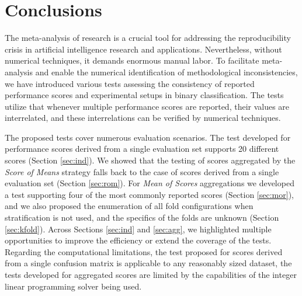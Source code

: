 \documentclass[3p, times]{elsarticle}
\begin{document}
\section{Conclusions}
\label{sec:conclusions}

The meta-analysis of research is a crucial tool for addressing the reproducibility crisis in artificial intelligence research and applications. Nevertheless, without numerical techniques, it demands enormous manual labor. To facilitate meta-analysis and enable the numerical identification of methodological inconsistencies, we have introduced various tests assessing the consistency of reported performance scores and experimental setups in binary classification. {\color{blue} The tests utilize that whenever multiple performance scores are reported, their values are interrelated, and these interrelations can be verified by numerical techniques.
}

The proposed tests cover numerous evaluation scenarios. The test developed for performance scores derived from a single evaluation set supports 20 different scores (Section \ref{sec:ind}). We showed that the testing of scores aggregated by the \emph{Score of Means} strategy falls back to the case of scores derived from a single evaluation set (Section \ref{sec:rom}). For \emph{Mean of Scores} aggregations we developed a test supporting four of the most commonly reported scores (Section \ref{sec:mor}), and we also proposed the enumeration of all fold configurations when stratification is not used, and the specifics of the folds are unknown (Section \ref{sec:kfold}). Across Sections \ref{sec:ind} and \ref{sec:agg}, we highlighted multiple opportunities to improve the efficiency or extend the coverage of the tests.
{\color{blue} Regarding the computational limitations, the test proposed for scores derived from a single confusion matrix is applicable to any reasonably sized dataset, the tests developed for aggregated scores are limited by the capabilities of the integer linear programming solver being used.}
\end{document}
